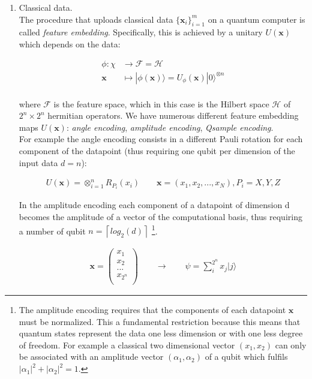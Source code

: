 \begin{enumerate}
    \item Classical data.\\
    The procedure that uploads classical data $\{\bm{x}_i\}_{i=1}^m$ on a quantum computer is called
    \textit{feature embedding}.
    Specifically, this is achieved by a unitary $U(\bm{x})$ which depends on the data:

    \begin{align}
        \phi : \chi &\rightarrow \mathcal{F} = \mathcal{H}\\
        \bm{x} &\mapsto |\phi(\bm{x})\rangle = U_{\phi}(\bm{x}) |0\rangle^{\otimes n}\\
    \end{align}

    where $\mathcal{F}$ is the feature space, which in this case is the Hilbert space $\mathcal{H}$ of 
    $2^n \times 2^n$ hermitian operators.
    We have numerous different feature embedding maps $U(\bm{x})$: \textit{angle encoding}, \textit{amplitude encoding},
    \textit{Qsample encoding}.\\
    For example the angle encoding consists in a different Pauli rotation for each component of the datapoint
    (thus requiring one qubit per dimension of the input data $d = n$):

    \begin{align}
        U(\bm{x}) = \otimes_{i=1}^n R_{P_i}(x_i) 
        \qquad 
        \bm{x} = (x_1, x_2, ..., x_N), P_i = {X, Y, Z}
    \end{align}

    In the amplitude encoding each component of a datapoint of dimension d becomes the amplitude of a vector 
    of the computational basis, thus requiring a number of qubit $n = \left\lceil log_2(d) \right\rceil$
    \footnote[1]{
        The amplitude encoding requires that the components of each datapoint $\bm{x}$ must be normalized. 
        This a fundamental restriction because 
        this means that quantum states represent the data one less dimension or with one less degree of freedom.
        For example a classical two dimensional vector $(x_1, x_2)$ can only be associated with an amplitude 
        vector $(\alpha_1, \alpha_2)$ of a qubit which fulfils $|\alpha_1|^2 + |\alpha_2|^2 = 1$.
    }.

    \begin{align}
    \bm{x} = \begin{pmatrix}
        x_1 \\
        x_2 \\
        ... \\
        x_{2^n} \\
    \end{pmatrix}
    \qquad
    \rightarrow
    \qquad
    \psi = \sum_i^{2^n} x_j | j \rangle
    \end{align}


\end{enumerate}

